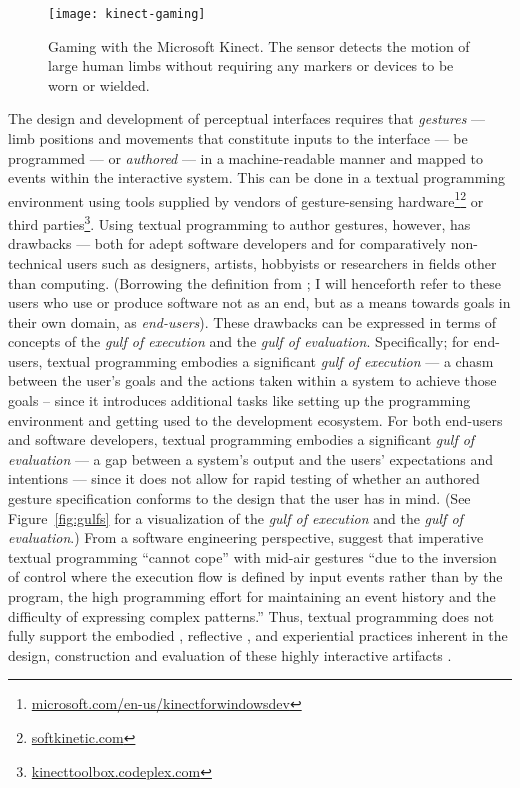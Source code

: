 \begin{SCfigure}[\sidecaptionrelwidth][t]
\centering
\texttt{[image: kinect-gaming]}
\caption{Gaming with the Microsoft Kinect. The sensor detects the motion of large human limbs without requiring any markers or devices to be worn or wielded.}
\label{fig:kinect-gaming}
\end{SCfigure}

The design and development of perceptual interfaces requires that \emph{gestures} --- limb positions and movements that constitute inputs to the interface --- be programmed \parencite{Lu:2012} --- or \emph{authored} \parencite{Kim:2013, Hartmann:2007} --- in a machine-readable manner and mapped to events within the interactive system. This can be done in a textual programming environment using tools supplied by vendors of gesture-sensing hardware\footnote{\href{http://www.microsoft.com/en-us/kinectforwindowsdev/}{microsoft.com/en-us/kinectforwindowsdev}}\footnote{\href{http://www.softkinetic.com}{softkinetic.com}} or third parties\footnote{\href{http://kinecttoolbox.codeplex.com}{kinecttoolbox.codeplex.com}}. Using textual programming to author gestures, however, has drawbacks --- both for adept software developers and for comparatively non-technical users such as designers, artists, hobbyists or researchers in fields other than computing. (Borrowing the definition from \textcite{Ko:2011}; I will henceforth refer to these users who use or produce software not as an end, but as a means towards goals in their own domain, as \emph{end-users}). These drawbacks can be expressed in terms of  concepts of the \emph{gulf of execution} and the \emph{gulf of evaluation}. Specifically; for end-users, textual programming embodies a significant \emph{gulf of execution} --- a chasm between the user's goals and the actions taken within a system to achieve those goals – since it introduces additional tasks like setting up the programming environment and getting used to the development ecosystem. For both end-users and software developers, textual programming embodies a significant \emph{gulf of evaluation} --- a gap between a system's output and the users' expectations and intentions --- since it does not allow for rapid testing of whether an authored gesture specification conforms to the design that the user has in mind. (See Figure~\ref{fig:gulfs} for a visualization of the \emph{gulf of execution} and the \emph{gulf of evaluation}.) From a software engineering perspective, \textcite{Hoste:2014} suggest that imperative textual programming “cannot cope” with mid-air gestures “due to the inversion of control where the execution flow is defined by input events rather than by the program, the high programming effort for maintaining an event history and the difficulty of expressing complex patterns.” Thus, textual programming does not fully support the embodied \parencite{Dourish:2004},  reflective \parencite{Schon:1984}, and experiential \parencite{Lindell:2014} practices inherent in the design, construction and evaluation \parencite{Hartmann:2006} of these highly interactive artifacts \parencite{Myers:2000, Lim:2008}.

